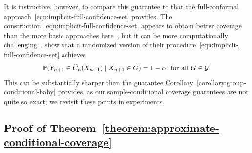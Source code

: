 \documentclass{article}
\newcommand{\scorefunc}{s}
\newcommand{\scoreval}{\scorefunc}
\begin{document}
It is instructive, however, to compare this guarantee to that the
full-conformal approach~\eqref{eqn:implicit-full-confidence-set}
provides.
%
The construction~\eqref{eqn:implicit-full-confidence-set}
appears to obtain better coverage than the more basic approaches
here~\cite[Fig.~3]{GibbsChCa25}, but it can be more
computationally challenging~\cite[Fig.~6]{GibbsChCa25}.
%
\citet{GibbsChCa25} show that a randomized version of their
procedure~\eqref{eqn:implicit-full-confidence-set} achieves
\begin{equation*}
  \mathbb{P}(Y_{n + 1} \in \widehat{C}_n(X_{n+1}) \mid X_{n + 1} \in G)
  = 1 - \alpha ~~ \mbox{for~all~} G \in \mathcal{G}.
\end{equation*}
%
This can be substantially sharper than the guarantee
Corollary~\ref{corollary:group-conditional-baby} provides, as our
sample-conditional coverage guarantees are not quite so exact; we revisit
these points in experiments.

\subsection{Proof of Theorem~\ref{theorem:approximate-conditional-coverage}}
\label{sec:proof-approximate-conditional-coverage}
\end{document}

